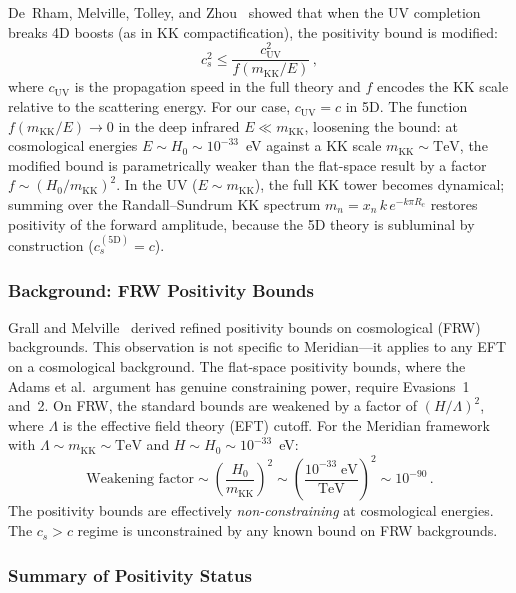 De~Rham, Melville, Tolley, and Zhou~\cite{ch5:deRhamMTZ2018} showed that when the UV completion breaks 4D boosts (as in KK compactification), the positivity bound is modified:
\begin{equation}
  c_s^2 \leq \frac{c_{\mathrm{UV}}^2}{f(m_{\mathrm{KK}}/E)}\,,
  \label{eq:5-modified-bound}
\end{equation}
where $c_{\mathrm{UV}}$ is the propagation speed in the full theory and $f$ encodes the KK scale relative to the scattering energy. For our case, $c_{\mathrm{UV}} = c$ in 5D. The function $f(m_{\mathrm{KK}}/E) \to 0$ in the deep infrared $E \ll m_{\mathrm{KK}}$, loosening the bound: at cosmological energies $E \sim H_0 \sim 10^{-33}$~eV against a KK scale $m_{\mathrm{KK}} \sim \mathrm{TeV}$, the modified bound is parametrically weaker than the flat-space result by a factor $f \sim (H_0/m_{\mathrm{KK}})^2$. In the UV ($E \sim m_{\mathrm{KK}}$), the full KK tower becomes dynamical; summing over the Randall--Sundrum KK spectrum $m_n = x_n\, k\, e^{-k\pi R_c}$ restores positivity of the forward amplitude, because the 5D theory is subluminal by construction ($c_s^{(\mathrm{5D})} = c$).

\subsubsection{Background: FRW Positivity Bounds}

Grall and Melville~\cite{ch5:GrallMelville2022} derived refined positivity bounds on cosmological (FRW) backgrounds. This observation is not specific to Meridian---it applies to any EFT on a cosmological background. The flat-space positivity bounds, where the Adams et al.\ argument has genuine constraining power, require Evasions~1 and~2. On FRW, the standard bounds are weakened by a factor of $(H/\Lambda)^2$, where $\Lambda$ is the effective field theory (EFT) cutoff. For the Meridian framework with $\Lambda \sim m_{\mathrm{KK}} \sim \mathrm{TeV}$ and $H \sim H_0 \sim 10^{-33}$~eV:
\begin{equation}
  \text{Weakening factor} \sim \left(\frac{H_0}{m_{\mathrm{KK}}}\right)^{\!2} \sim \left(\frac{10^{-33}\;\mathrm{eV}}{\mathrm{TeV}}\right)^{\!2} \sim 10^{-90}\,.
  \label{eq:5-frw-weakening}
\end{equation}
The positivity bounds are effectively \emph{non-constraining} at cosmological energies. The $c_s > c$ regime is unconstrained by any known bound on FRW backgrounds.

\subsubsection{Summary of Positivity Status}

